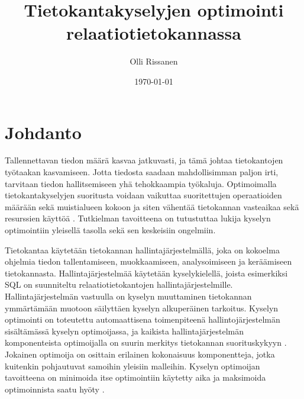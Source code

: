 \documentclass[finnish]{tktltiki2}
\title{Tietokantakyselyjen optimointi relaatiotietokannassa}
\author{Olli Rissanen}
\date{\today}
\theoremstyle{definition}
\theoremstyle{remark}
\begin{document}

\maketitle
\makeabstract
\tableofcontents
\newpage

\setlength{\parskip}{\medskipamount}
\setlength{\parindent}{0pt}



\section{Johdanto}
Tallennettavan tiedon määrä kasvaa jatkuvasti, ja %
tämä johtaa tietokantojen työtaakan kasvamiseen. Jotta tiedosta saadaan mahdollisimman paljon irti, tarvitaan tiedon hallitsemiseen yhä tehokkaampia työkaluja. %
Optimoimalla tietokantakyselyjen suoritusta voidaan vaikuttaa suoritettujen operaatioiden määrään sekä muistialueen kokoon ja siten vähentää tietokannan vasteaikaa sekä resurssien käyttöä \cite{mor2012}.  Tutkielman tavoitteena on tutustuttaa lukija kyselyn optimointiin yleisellä tasolla sekä sen keskeisiin ongelmiin. 
	
% 

Tietokantaa käytetään tietokannan hallintajärjestelmällä, joka on kokoelma ohjelmia tiedon tallentamiseen, muokkaamiseen, analysoimiseen ja keräämiseen tietokannasta. Hallintajärjestelmää käytetään kyselykielellä, joista esimerkiksi SQL \cite{5391051} on suunniteltu relaatiotietokantojen hallintajärjestelmille. Hallintajärjestelmän vastuulla on kyselyn muuttaminen tietokannan ymmärtämään muotoon säilyttäen kyselyn alkuperäinen tarkoitus. Kyselyn optimointi on toteutettu automaattisena toimenpiteenä hallintojärjestelmän sisältämässä kyselyn optimoijassa, ja kaikista hallintajärjestelmän komponenteista optimoijalla on suurin merkitys tietokannan suorituskykyyn \cite{mor2012}. Jokainen optimoija on osittain erilainen kokonaisuus komponentteja, jotka kuitenkin pohjautuvat samoihin yleisiin malleihin. Kyselyn optimoijan tavoitteena on minimoida itse optimointiin käytetty aika ja maksimoida optimoinnista saatu hyöty \cite{jarke1984}. 
\end{document}

